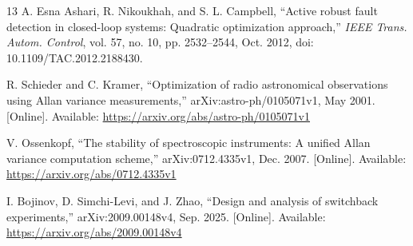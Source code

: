 \documentclass[journal]{IEEEtran}
\begin{document}
\begin{thebibliography}{13}
A. Esna Ashari, R. Nikoukhah, and S. L. Campbell,
``Active robust fault detection in closed-loop systems: Quadratic optimization
approach,'' \emph{IEEE Trans. Autom. Control}, vol. 57, no. 10,
pp. 2532--2544, Oct. 2012, doi: 10.1109/TAC.2012.2188430.

R. Schieder and C. Kramer,
``Optimization of radio astronomical observations using Allan variance measurements,''
arXiv:astro-ph/0105071v1, May 2001.
[Online]. Available: \url{https://arxiv.org/abs/astro-ph/0105071v1}

V. Ossenkopf,
``The stability of spectroscopic instruments: A unified Allan variance computation scheme,''
arXiv:0712.4335v1, Dec. 2007.
[Online]. Available: \url{https://arxiv.org/abs/0712.4335v1}

I. Bojinov, D. Simchi-Levi, and J. Zhao,
``Design and analysis of switchback experiments,''
arXiv:2009.00148v4, Sep. 2025.
[Online]. Available: \url{https://arxiv.org/abs/2009.00148v4}

\end{thebibliography}
\end{document}
